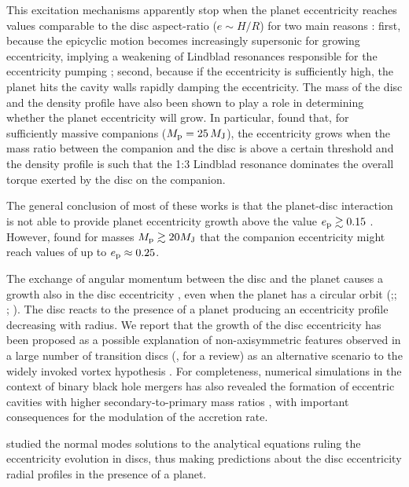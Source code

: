 \documentclass[usenatbib,a4paper,times,fleqn]{mnras}
\begin{document}
This excitation mechanisms apparently stop when the planet eccentricity reaches values comparable to the disc aspect-ratio ($e\sim H/R$) for two main reasons \citep{duffell2015}: first, because the epicyclic motion becomes increasingly supersonic for growing eccentricity, implying a weakening of Lindblad resonances responsible for the eccentricity pumping \citep{papaloizou2000}; second, because if the eccentricity is sufficiently high, the planet hits the cavity walls rapidly damping the eccentricity.
The mass of the disc and the density profile have also been shown to play a role in determining whether the planet eccentricity will grow. In particular, \citet{dunhill2013} found that, for sufficiently massive companions ($M_{\rm p}=25 \, M_{\rm J}$), the  eccentricity grows when the mass ratio between the companion and the disc is above a certain threshold and the density profile is such that the 1:3 Lindblad resonance dominates the overall torque exerted by the disc on the companion. 

The general conclusion of most of these works is that the planet-disc interaction is not able to provide planet eccentricity growth above the value $e_{\rm p}\gtrsim 0.15$ \citep{dangelo2006,muller2013,duffell2015,thun2017}. However, \citet{papaloizou2001} found for masses $M_{\rm p}\gtrsim 20 M_{\rm J}$ that the companion eccentricity might reach values of up to $e_{\rm p}\approx 0.25$. 

The exchange of angular momentum between the disc and the planet causes a growth also in the disc eccentricity \citep{goldreich1981}, even when the planet has a circular orbit (\citealp{papaloizou2001};\citealp{kley2006}; \citealp{teyssandier2016}; \citealp{teyssandier2017}). The disc reacts to the presence of a planet producing an eccentricity profile decreasing with radius. We report that the growth of the disc eccentricity has been proposed as a possible explanation of non-axisymmetric features \citep{ataiee2013,ragusa2017} observed in a large number of transition discs (\citealp{casassus2016}, for a review) as an alternative scenario to the widely invoked vortex hypothesis \citep{regaly2012,ataiee2013,lyra2013}. For completeness, numerical simulations in the context of binary black hole mergers has also revealed the formation of eccentric cavities with higher secondary-to-primary mass ratios \citep{armitage2005,shi2012,dorazio2013,farris2014,dorazio2016,ragusa2016}, with important consequences for the modulation of the accretion rate.

\citet{teyssandier2016} studied the normal modes solutions to the analytical equations ruling the eccentricity evolution in discs, thus making predictions about the disc eccentricity radial profiles in the presence of a planet. 
\end{document}
